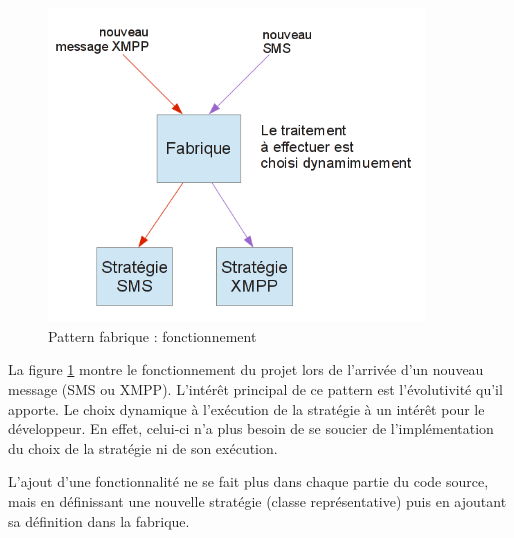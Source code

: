 \begin{figure}[!h]
  \center
  \includegraphics[width=10cm]{img/fonctionnement-strategie-factorie.png}
  \caption{Pattern fabrique : fonctionnement}
  \label{fonctionnement-strategie-factorie}
\end{figure}

La figure \ref{fonctionnement-strategie-factorie} montre le fonctionnement du projet lors de l'arrivée d'un
nouveau message (SMS ou XMPP).
L'intérêt principal de ce pattern est l'évolutivité qu'il apporte.
Le choix dynamique à l'exécution de la stratégie à un intérêt pour le développeur.
En effet, celui-ci n'a plus besoin de se soucier de l'implémentation du choix de la stratégie ni de son exécution.

L'ajout d'une fonctionnalité ne se fait plus dans chaque partie du code source, mais en définissant une nouvelle stratégie (classe représentative) puis en ajoutant sa définition dans la fabrique.
